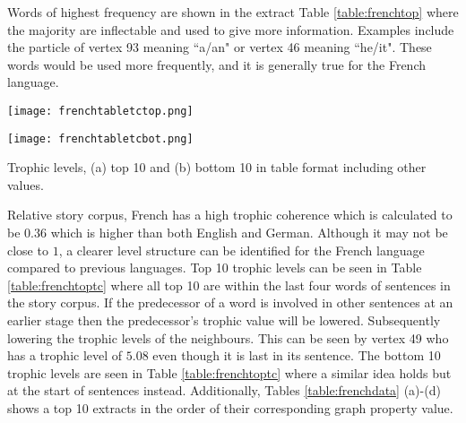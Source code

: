 Words of highest frequency are shown in the extract Table \ref{table:frenchtop} where the majority are inflectable and used to give more information. Examples include the particle of vertex 93 meaning ``a/an" or vertex 46 meaning ``he/it". These words would be used more frequently, and it is generally true for the French language.

\begin{table}[!htb]
\centering
\begin{subtable}{.45\textwidth}
	\centering
	\texttt{[image: frenchtabletctop.png]}
	\caption{}
	\label{table:frenchtoptc}
\end{subtable}
\hfill
\begin{subtable}{.45\textwidth}
	\centering
	\texttt{[image: frenchtabletcbot.png]}
	\caption{}
	\label{table:frenchbottc}
\end{subtable}
\caption{Trophic levels, (a) top 10 and (b) bottom 10 in table format including other values.}
\end{table}

Relative story corpus, French has a high trophic coherence which is calculated to be $0.36$ which is higher than both English and German. Although it may not be close to $1$, a clearer level structure can be identified for the French language compared to previous languages. Top 10 trophic levels can be seen in Table \ref{table:frenchtoptc} where all top 10 are within the last four words of sentences in the story corpus. If the predecessor of a word is involved in other sentences at an earlier stage then the predecessor's trophic value will be lowered. Subsequently lowering the trophic levels of the neighbours. This can be seen by vertex 49 who has a trophic level of $5.08$ even though it is last in its sentence. The bottom 10 trophic levels are seen in Table \ref{table:frenchtoptc} where a similar idea holds but at the start of sentences instead. Additionally, Tables \ref{table:frenchdata} (a)-(d) shows a top 10 extracts in the order of their corresponding graph property value.

